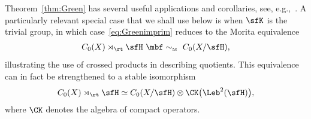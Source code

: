 Theorem~\ref{thm:Green} has several useful applications and
corollaries, see, e.g.,~\cite{Rieffel1976}. A particularly relevant
special case that we shall use below is when $\sfK $ is the trivial group,
in which case~\eqref{eq:Greenimprim} reduces to the Morita equivalence
\begin{gather*}%
C_0(X)\rtimes_\rt \sfH \ \mbf\sim_{\text{\tiny M}} \ C_0(X/\sfH ) ,
\end{gather*}
illustrating the use of crossed products in describing
quotients. This equivalence can in fact be strengthened to a stable
isomorphism~\cite{Rieffel1976}
\begin{gather}\label{eq:XsfHiso}
C_0(X)\rtimes_\rt \sfH \simeq C_0(X/\sfH ) \otimes \CK\big(\Leb^2(\sfH)\big) ,
\end{gather}
where $\CK$ denotes the algebra of
compact operators.
